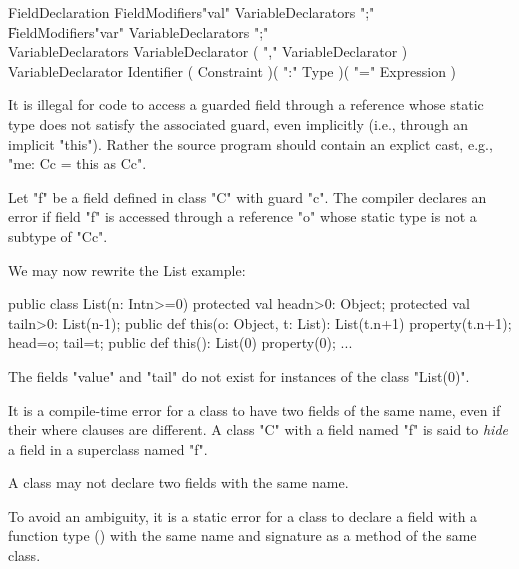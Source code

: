 \begin{grammar}
FieldDeclaration  \:
   FieldModifiers\opt \xcd"val" VariableDeclarators \xcd";" \\
   \|
   FieldModifiers\opt \xcd"var" VariableDeclarators \xcd";" \\
VariableDeclarators \:
        VariableDeclarator ( \xcd"," VariableDeclarator )\star \\
VariableDeclarator \:
   Identifier ( Constraint )\opt ( \xcd":" Type )\opt ( \xcd"=" Expression )\opt \\
\end{grammar}

It is illegal for code to access a guarded field through a reference
whose static type does not satisfy the associated guard, even
implicitly (i.e., through an implicit \xcd"this"). Rather the source
program should contain an explict cast, e.g., \xcd"me: C{c} = this as C{c}".

\begin{staticrule*}
Let \xcd"f" be a field defined in class
\xcd"C" with guard \xcd"c".  The compiler declares an error if
field \xcd"f" is accessed through a reference \xcd"o" whose static
type is not a subtype of \xcd"C{c}".
\end{staticrule*}

\begin{example}

We may now rewrite the List example:
\begin{xten}
public class List(n: Int{n>=0}) {
  protected val head{n>0}: Object;
  protected val tail{n>0}: List(n-1);
  public def this(o: Object, t: List): List(t.n+1) {
     property(t.n+1);
     head=o;
     tail=t;
  }
  public def this(): List(0) {
     property(0);
  }
  ...
}
\end{xten}

The fields \xcd"value" and \xcd"tail" do not exist for instances of the class
\xcd"List(0)".
\end{example}

It is a compile-time error for a class to have two fields of the same
name, even if their where clauses are different. A class \xcd"C" with a field
named \xcd"f" is said to {\em hide} a field in a superclass named \xcd"f".

\begin{staticrule*}
     A class may not declare two fields with the same name.
\end{staticrule*}

To avoid an ambiguity, it is a static error for a class to
declare a field with a function type () with
the same name and signature  as a method of the same class.

